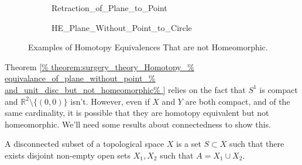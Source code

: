 \documentclass[crop=false,class=article,oneside]{standalone}
\begin{document}
        \begin{figure}[H]
            \centering
            \captionsetup{type=figure}
            \begin{subfigure}[b]{0.33\textwidth}
                \captionsetup{type=figure}
                \centering
                {Retraction_of_Plane_to_Point}
                \label{%
                    fig:surgery_theory_course_homotopy_%
                    equivalence_diagram_of_plane_with_point%
                }
            \end{subfigure}
            \begin{subfigure}[b]{0.66\textwidth}
                \captionsetup{type=figure}
                \centering
                
                          {HE_Plane_Without_Point_to_Circle}
                \label{%
                    fig:surgery_theory_homotopy_equivalence_%
                    between_the_plane_with_a_point_removed_%
                    and_the_unit_circle%
                }
            \end{subfigure}
            \caption[%
                Examples of Homotopy Equivalences
                That are not Homeomorphic
            ]{%
                Examples of Homotopy Equivalences
                That are not Homeomorphic.
            }
            \label{%
                fig:surgery_theory_course_various_HE_%
                but_not_homeo_examples%
            }
        \end{figure}
        Theorem \ref{%
            theorem:surgery_theory_Homotopy_%
            equivalance_of_plane_without_point_%
            and_unit_disc_but_not_homeomorphic%
        }
        relies on the fact that $S^{1}$ is compact and
        $\mathbb{R}^{2}\setminus\{(0,0)\}$ isn't.
        However, even if $X$ and $Y$ are both
        compact, and of the same cardinality, it is possible
        that they are homotopy equivalent but not homeomorphic.
        We'll need some results about connectedness to show this.
        \begin{definition}
            A disconnected subset of a topological space $X$
            is a set $S\subset{X}$ such that there exists
            disjoint non-empty open sets $X_{1},X_{2}$ such
            that $A=X_{1}\cup{X_{2}}$.
        \end{definition}
\end{document}
